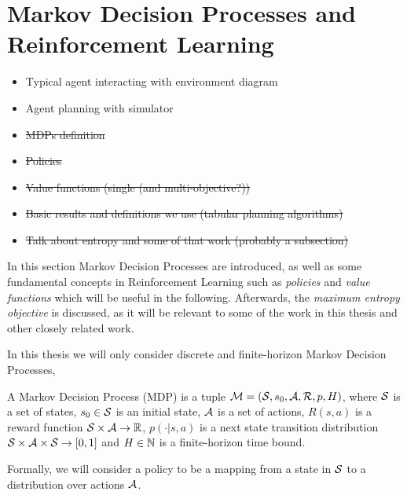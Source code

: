 \section{Markov Decision Processes and Reinforcement Learning}
\label{sec:2-1-rl}

    \begin{itemize}
        \item Typical agent interacting with environment diagram 
        \item Agent planning with simulator 
        \item \st{MDPs definition}
        \item \st{Policies}
        \item \st{Value functions (single (and multi-objective?))}
        \item \st{Basic results and definitions we use (tabular planning algorithms)}
        \item \st{Talk about entropy and some of that work (probably a subsection)}
    \end{itemize}

    In this section Markov Decision Processes are introduced, as well as some fundamental concepts in Reinforcement Learning such as \textit{policies} and \textit{value functions} which will be useful in the following. Afterwards, the \textit{maximum entropy objective} is discussed, as it will be relevant to some of the work in this thesis and other closely related work. 

    In this thesis we will only consider discrete and finite-horizon Markov Decision Processes, 

    \begin{defn}
        \label{def:mdp}
        A \textnormal{Markov Decision Process} (MDP) is a tuple $\mathcal{M}=(\mathcal{S},s_0,\mathcal{A},\mathcal{R},p,H)$, where $\mathcal{S}$ is a set of states, $s_0\in\mathcal{S}$ is an initial state, $\mathcal{A}$ is a set of actions, $R(s,a)$ is a reward function $\mathcal{S}\times \mathcal{A}\rightarrow \mathbb{R}$, $p(\cdot | s,a)$ is a next state transition distribution $\mathcal{S} \times \mathcal{A} \times \mathcal{S} \rightarrow [0,1]$ and $H\in\mathbb{N}$ is a finite-horizon time bound. 
    \end{defn}

    Formally, we will consider a policy to be a mapping from a state in $\mathcal{S}$ to a distribution over actions $\mathcal{A}$. 

